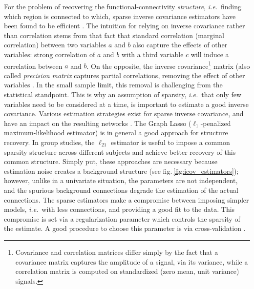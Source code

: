 \documentclass[5p]{elsarticle}
\begin{document}
For the problem of recovering the functional-connectivity
\emph{structure}, \emph{i.e.}\ finding which region is connected to
which, sparse inverse covariance estimators have been found to be
efficient \cite{varoquaux2010c,smith2011,ryali2012}. The intuition for relying on
inverse covariance rather than correlation stems from that fact that
standard correlation (marginal correlation) between two variables $a$ and
$b$ also capture the effects of other variables: strong correlation of
$a$ and $b$ with a third variable $c$ will induce a correlation between
$a$ and $b$. On the opposite, the inverse covariance\footnote{Covariance
and correlation matrices differ simply by the fact that a covariance
matrix captures the amplitude of a signal, via its variance, while a
correlation matrix is computed on standardized (zero mean, unit variance) signals.}
matrix (also called \emph{precision matrix} captures
partial correlations, removing the effect of other variables
\cite{marrelec2006a}. In the small sample limit, this removal is
challenging from the statistical standpoint. This is why an assumption 
of sparsity,
\emph{i.e.}\ that only few variables need to be considered at a time, is
important to estimate a good inverse covariance. Various estimation
strategies exist for sparse inverse covariance, and have an impact on the
resulting networks \cite{varoquaux2012,varoquaux2010c}. The
Graph Lasso ($\ell_1$-penalized maximum-likelihood estimator)
\cite{friedman2008} is in general a good approach for structure recovery. In group studies,
the $\ell_{21}$ estimator \cite{varoquaux2010c,honorio2012} is useful to
impose a common sparsity structure across different subjects and achieve
better recovery of this common structure. Simply put, these approaches
are necessary because estimation noise creates a background structure
(see fig.\,\ref{fig:icov_estimators}); however, unlike in a univariate situation, the
parameters are not independent, and the spurious background connections
degrade the estimation of the actual connections. The sparse estimators
make a compromise between imposing simpler models, \emph{i.e.}\ with less
connections, and providing a good fit to the data. This compromise is set via a
regularization parameter which controls the sparsity of the estimate. A
good procedure to choose this parameter is via cross-validation
\cite{varoquaux2010c}.

\end{document}
